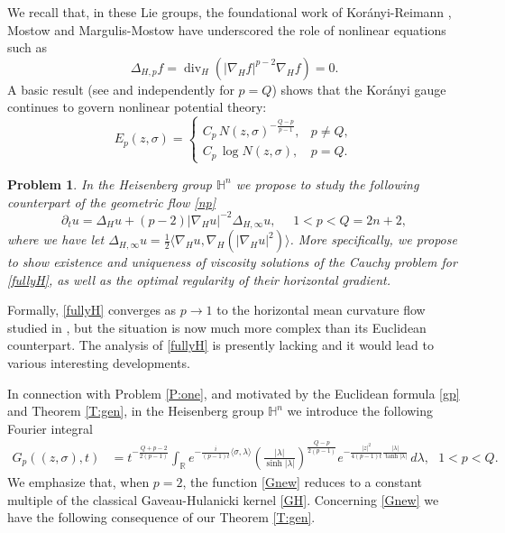 \documentclass[11pt,a4paper]{amsart}
\def \R {\mathbb{R}}
\newcommand{\Hn}{\mathbb H^n}
\newcommand{\p}{\partial}
\numberwithin{equation}{section}
\newcommand{\nh}{\nabla_H}
\newcommand{\sa}{\langle}
\newcommand{\da}{\rangle}
\newtheorem{prob}{Problem}
\numberwithin{equation}{section}
\begin{document}
We recall that, in these Lie groups, the foundational work of Kor\'anyi-Reimann \cite{KoR, KoRaim}, Mostow \cite{Mo} and Margulis-Mostow \cite{MM} have underscored the role  of nonlinear equations such as
\begin{equation}\label{pH}
\Delta_{H,p} f = \operatorname{div}_H(|\nabla_H f|^{p-2}\nabla_H f)=0.
\end{equation}
A basic result (see \cite[Theor. 2.1]{CDGcap} and independently \cite{HH} for $p=Q$) shows that the Korányi gauge continues to govern nonlinear potential theory:
\begin{equation}\label{fs}
E_p(z,\sigma)
 = \begin{cases}
   C_p\, N(z,\sigma)^{-\frac{Q-p}{p-1}}, & p\neq Q, \\[6pt]
   C_p\, \log N(z,\sigma), & p=Q.
   \end{cases}
\end{equation}

\vskip 0.2in

\begin{prob}\label{P:two}
 In the Heisenberg group $\Hn$ we propose to study the following counterpart of the geometric flow \eqref{np}
\begin{equation}\label{fullyH}
\p_t u =  \Delta_H u + (p-2)|\nabla_H u|^{-2}\Delta_{H,\infty} u,\ \ \ \ \ \ 1<p<Q = 2n+2,
\end{equation}
where we have let $\Delta_{H,\infty} u = \frac 12 \sa\nh u,\nh(|\nh u|^2)\da$. More specifically, we propose to show existence and uniqueness of viscosity solutions of the Cauchy problem for \eqref{fullyH}, as well as the optimal regularity of their horizontal gradient. 
\end{prob}

\vskip 0.2in

Formally, \eqref{fullyH} converges as $p\to 1$ to the horizontal mean curvature flow studied in \cite{CC}, but the situation is now much more complex than its Euclidean  counterpart. The analysis of \eqref{fullyH} is presently lacking and it would lead to various interesting developments. 



In connection with Problem \ref{P:one}, and motivated by the Euclidean formula \eqref{gp} and Theorem \ref{T:gen}, in the Heisenberg group $\Hn$ we introduce the following Fourier integral
\begin{align}\label{Gnew}
G_p((z,\sigma),t)
  &=
    t^{-\frac{Q+p-2}{2(p-1)}}
    \int_{\R}
    e^{-\frac{i}{(p-1)t}\langle\sigma,\lambda\rangle}
    \left(\frac{|\lambda|}{\sinh |\lambda|}\right)^{\frac{Q-p}{2(p-1)} }
    e^{-\frac{|z|^2}{4(p-1)t}\frac{|\lambda|}{\tanh |\lambda|}}
    \, d\lambda,\ \ \ 1<p<Q.
\end{align} 
We emphasize that, when $p=2$, the function \eqref{Gnew} reduces to a constant multiple of the classical Gaveau-Hulanicki kernel \eqref{GH}. Concerning \eqref{Gnew} we have the following consequence of our Theorem \ref{T:gen}.
\end{document}
